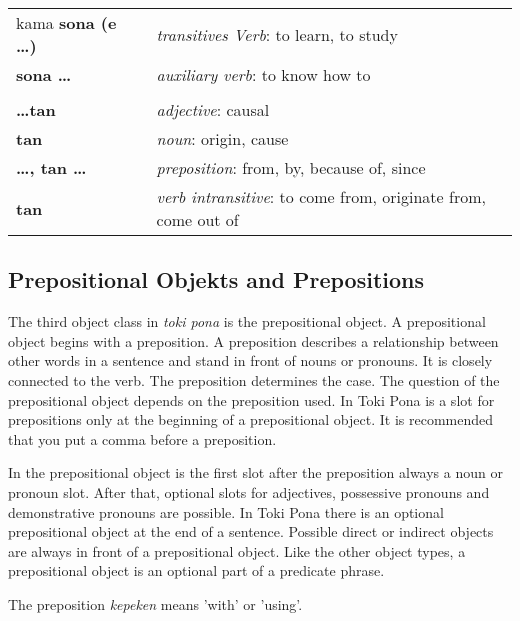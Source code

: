 \begin{supertabular}{p{2,5cm}|ll}
kama \textbf{sona (e \dots)} && \textit{transitives Verb}: to learn, to study \\ %
\textbf{sona \dots} && \textit{auxiliary verb}: to know how to \\ %
 && \\ %
%
\textbf{\dots tan} && \textit{adjective}: causal \\ %
\textbf{tan} && \textit{noun}: origin, cause \\ %
\textbf{\dots , tan \dots} && \textit{preposition}: from, by, because of, since \\ %
\textbf{tan} && \textit{verb intransitive}: to come from, originate from, come out of \\ %
\end{supertabular}
%
\newpage
%
\subsection*{Prepositional Objekts and Prepositions}
%
%
The third object class in \textit{toki pona} is the prepositional object. 
A prepositional object begins with a preposition. 
A preposition describes a relationship between other words in a sentence and stand in front of nouns or pronouns. 
It is closely connected to the verb. 
The preposition determines the case. 
The question of the prepositional object depends on the preposition used. 
In Toki Pona is a slot for prepositions only at the beginning of a prepositional object. 
It is recommended that you put a comma before a preposition.

In the prepositional object is the first slot after the preposition always a noun or pronoun slot.
After that, optional slots for adjectives, possessive pronouns and demonstrative pronouns are possible. 
In Toki Pona there is an optional prepositional object at the end of a sentence. 
Possible direct or indirect objects are always in front of a prepositional object. 
Like the other object types, a prepositional object is an optional part of a predicate phrase. 


The preposition \textit{kepeken} means 'with' or 'using'.

